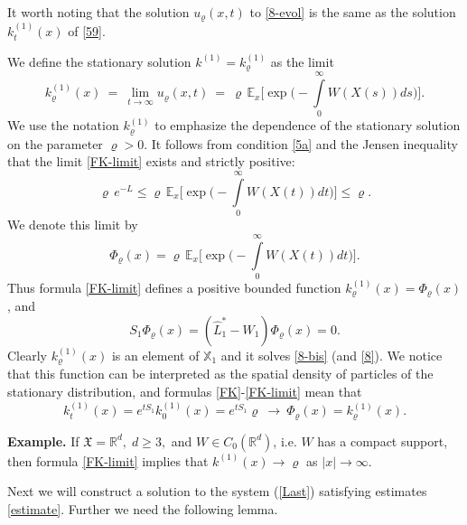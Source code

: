 \documentclass[a4paper,12pt]{article}
\newcommand{\XX}{{\mathbb X}}
\newcommand{\XXX}{{\mathfrak{X}}}
\begin{document}
It worth noting that the solution $u_\varrho (x, t)$ to \eqref{8-evol} is the same as the solution $k_t^{(1)}(x)$ of \eqref{59}.

We define the stationary solution $k^{(1)} = k^{(1)}_\varrho$ as the limit
\begin{equation}\label{FK-limit}
k^{(1)}_\varrho (x) \ = \ \lim_{t \to \infty} u_\varrho(x,t) \ = \ \varrho \, \mathbb{E}_x \big[ \exp \big(- \int\limits_0^\infty W(X(s)) ds \big) \big].
\end{equation}
We use the notation $k^{(1)}_\varrho$ to emphasize the dependence of the stationary solution on the parameter $\varrho>0$.
It follows from condition \eqref{5a} and the Jensen inequality that the limit \eqref{FK-limit} exists and strictly positive:
\begin{equation}\label{Phi-est}
\varrho \, e^{-L} \le  \varrho \, \mathbb{E}_x \big[ \exp \big(- \int\limits_0^\infty W(X(t)) dt \big) \big] \le \varrho.
\end{equation}
We denote this limit by
\begin{equation}\label{Phi}
\Phi_\varrho (x) =   \varrho \, \mathbb{E}_x \big[ \exp \big(- \int\limits_0^\infty W(X(t)) dt \big) \big].
\end{equation}
Thus formula \eqref{FK-limit} defines a positive bounded function $k_\varrho^{(1)}(x) = \Phi_\varrho(x)$, and
$$
S_1 \Phi_\varrho (x) = (\hat L_1^{\ast} - W_1) \Phi_\varrho (x)  = 0.
$$
Clearly $k_\varrho^{(1)}(x) $ is an element of $\XX_{1}$ and it solves \eqref{8-bis} (and \eqref{8}).
We notice that this function can be interpreted as the spatial density of particles of the stationary distribution,
and formulas \eqref{FK}-\eqref{FK-limit} mean that
$$
k_t^{(1)}(x) = e^{t S_1}  k_0^{(1)}(x) = e^{t S_1} \varrho \ \to \  \Phi_\varrho(x) = k_\varrho^{(1)}(x).
$$

{\bf Example.} If $\XXX = \mathbb{R}^d, \; d \ge 3,$ and  $W \in C_0(\mathbb{R}^d)$, i.e. $W$ has a compact support, then formula \eqref{FK-limit} implies that  $k^{(1)}(x) \to \varrho $ as $|x| \to \infty$.
\medskip

Next we will construct a solution to the system (\ref{Last}) satisfying estimates \eqref{estimate}.
Further we need the following lemma.





\end{document}
